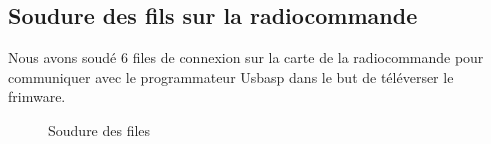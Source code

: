	\subsection{Soudure des fils sur la radiocommande}
	Nous avons soudé 6 files de connexion  sur la carte de la radiocommande pour communiquer avec le programmateur Usbasp dans le but de téléverser le frimware.
	\begin{figure}[H]
		\begin{center}
			\centering
		\end{center}
		\caption{Soudure des files\label{fig:S.F}}
	\end{figure}

